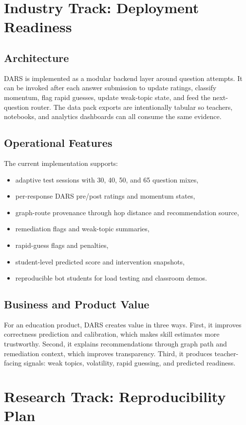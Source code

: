 \documentclass[sigconf,nonacm]{acmart}
\begin{document}
\section{Industry Track: Deployment Readiness}
\subsection{Architecture}
DARS is implemented as a modular backend layer around question attempts. It can be invoked after each answer submission to update ratings, classify momentum, flag rapid guesses, update weak-topic state, and feed the next-question router. The data pack exports are intentionally tabular so teachers, notebooks, and analytics dashboards can all consume the same evidence.

\subsection{Operational Features}
The current implementation supports:
\begin{itemize}[leftmargin=*]
  \item adaptive test sessions with 30, 40, 50, and 65 question mixes,
  \item per-response DARS pre/post ratings and momentum states,
  \item graph-route provenance through hop distance and recommendation source,
  \item remediation flags and weak-topic summaries,
  \item rapid-guess flags and penalties,
  \item student-level predicted score and intervention snapshots,
  \item reproducible bot students for load testing and classroom demos.
\end{itemize}

\subsection{Business and Product Value}
For an education product, DARS creates value in three ways. First, it improves correctness prediction and calibration, which makes skill estimates more trustworthy. Second, it explains recommendations through graph path and remediation context, which improves transparency. Third, it produces teacher-facing signals: weak topics, volatility, rapid guessing, and predicted readiness.

\section{Research Track: Reproducibility Plan}
\end{document}
